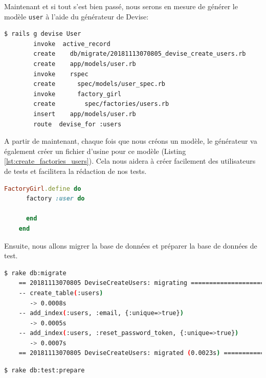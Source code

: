 \documentclass[]{report}
\begin{document}
    Maintenant et si tout s'est bien passé, nous serons en mesure de générer le modèle \verb|user| à l'aide du générateur de Devise:

    \begin{scriptsize}
    \begin{lstlisting}[language=bash]
    $ rails g devise User
        invoke  active_record
        create    db/migrate/20181113070805_devise_create_users.rb
        create    app/models/user.rb
        invoke    rspec
        create      spec/models/user_spec.rb
        invoke      factory_girl
        create        spec/factories/users.rb
        insert    app/models/user.rb
        route  devise_for :users
    \end{lstlisting}
    \end{scriptsize}

    A partir de maintenant, chaque fois que nous créons un modèle, le générateur va également créer un fichier d'usine pour ce modèle (Listing \ref{lst:create_factories_users}). Cela nous aidera à créer facilement des utilisateurs de tests et facilitera la rédaction de nos tests.

    \begin{scriptsize}
    \begin{lstlisting}[language=ruby, caption={Usine d'utilsateurs (spec/factories/users.rb)}, label={lst:create_factories_users}]
    FactoryGirl.define do
      factory :user do

      end
    end
    \end{lstlisting}
    \end{scriptsize}

    Ensuite, nous allons migrer la base de données et préparer la base de données de test.

    \begin{scriptsize}
    \begin{lstlisting}[language=bash]
    $ rake db:migrate
    == 20181113070805 DeviseCreateUsers: migrating ================================
    -- create_table(:users)
       -> 0.0008s
    -- add_index(:users, :email, {:unique=>true})
       -> 0.0005s
    -- add_index(:users, :reset_password_token, {:unique=>true})
       -> 0.0007s
    == 20181113070805 DeviseCreateUsers: migrated (0.0023s) =======================
    \end{lstlisting}
    \end{scriptsize}

    \begin{scriptsize}
    \begin{lstlisting}[language=bash]
    $ rake db:test:prepare
    \end{lstlisting}
    \end{scriptsize}
\end{document}
